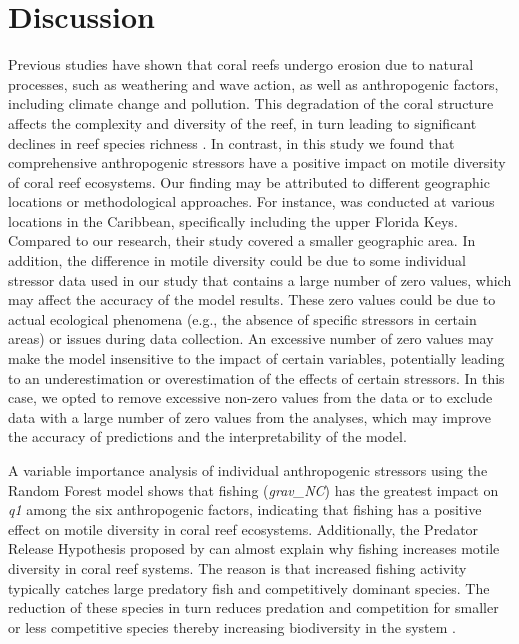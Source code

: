 \documentclass[a4paper, 11]{article}
\begin{document}
\section{Discussion}
Previous studies have shown that coral reefs undergo erosion due to natural processes, such as weathering and wave action, as well as anthropogenic factors, including climate change and pollution. This degradation of the coral structure affects the complexity and diversity of the reef, in turn leading to significant declines in reef species richness \citep{enochs2012species}. In contrast, in this study we found that comprehensive anthropogenic stressors have a positive impact on motile diversity of coral reef ecosystems. Our finding may be attributed to different geographic locations or methodological approaches. For instance, \citet{enochs2012species} was conducted at various locations in the Caribbean, specifically including the upper Florida Keys. Compared to our research, their study covered a smaller geographic area. In addition, the difference in motile diversity could be due to some individual stressor data used in our study that contains a large number of zero values, which may affect the accuracy of the model results. These zero values could be due to actual ecological phenomena (e.g., the absence of specific stressors in certain areas) or issues during data collection. An excessive number of zero values may make the model insensitive to the impact of certain variables, potentially leading to an underestimation or overestimation of the effects of certain stressors. In this case, we opted to remove excessive non-zero values from the data or to exclude data with a large number of zero values from the analyses, which may improve the accuracy of predictions and the interpretability of the model. 

A variable importance analysis of individual anthropogenic stressors using the Random Forest model shows that fishing (\textit{grav\_NC}) has the greatest impact on \textit{q1} among the six anthropogenic factors, indicating that fishing has a positive effect on motile diversity in coral reef ecosystems. Additionally, the Predator Release Hypothesis proposed by \citet{paine1974intertidal} can almost explain why fishing increases motile diversity in coral reef systems. The reason is that increased fishing activity typically catches large predatory fish and competitively dominant species. The reduction of these species in turn reduces predation and competition for smaller or less competitive species thereby increasing biodiversity in the system \citep{paine1974intertidal}.
\end{document}
